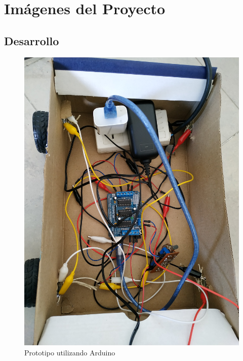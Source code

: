 \section{Imágenes del Proyecto}

\subsection{Desarrollo}

\begin{figure}[H]
	\centering
	\includegraphics[width=0.9\linewidth]{imagenes/ensayo1.jpg}
	\caption{Prototipo utilizando Arduino}
	\label{fig:ensayo1}
\end{figure}

